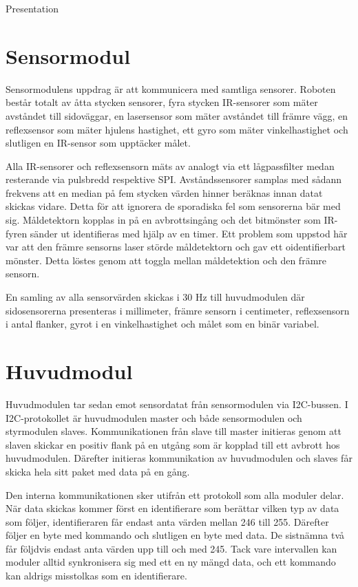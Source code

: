 \documentclass[10pt]{article}
\begin{document}
\begin{center}
\Huge Presentation
\end{center}

\section{Sensormodul}
Sensormodulens uppdrag är att kommunicera med samtliga sensorer. Roboten består totalt av åtta stycken sensorer, fyra stycken IR-sensorer som mäter avståndet till sidoväggar, en lasersensor som mäter avståndet till främre vägg, en reflexsensor som mäter hjulens hastighet, ett gyro som mäter vinkelhastighet och slutligen en IR-sensor som upptäcker målet. 

Alla IR-sensorer och reflexsensorn mäts av analogt via ett lågpassfilter medan resterande via pulsbredd respektive SPI. Avståndssensorer samplas med sådann frekvens att en median på fem stycken värden hinner beräknas innan datat skickas vidare. Detta för att ignorera de sporadiska fel som sensorerna bär med sig. Måldetektorn kopplas in på en avbrottsingång och det bitmönster som IR-fyren sänder ut identifieras med hjälp av en timer. Ett problem som uppstod här var att den främre sensorns laser störde måldetektorn och gav ett oidentifierbart mönster. Detta löstes genom att toggla mellan måldetektion och den främre sensorn. 

En samling av alla sensorvärden skickas i 30 Hz till huvudmodulen där sidosensorerna presenteras i millimeter, främre sensorn i centimeter, reflexsensorn i antal flanker, gyrot i en vinkelhastighet och målet som en binär variabel. 

\section{Huvudmodul}
Huvudmodulen tar sedan emot sensordatat från sensormodulen via I2C-bussen. I I2C-protokollet är huvudmodulen master och både sensormodulen och styrmodulen slaves. Kommunikationen från slave till master initieras genom att slaven skickar en positiv flank på en utgång som är kopplad till ett avbrott hos huvudmodulen. Därefter initieras kommunikation av huvudmodulen och slaves får skicka hela sitt paket med data på en gång. 

Den interna kommunikationen sker utifrån ett protokoll som alla moduler delar. När data skickas kommer först en identifierare som berättar vilken typ av data som följer, identifieraren får endast anta värden mellan 246 till 255. Därefter följer en byte med kommando och slutligen en byte med data. De sistnämna två får följdvis endast anta värden upp till och med 245. Tack vare intervallen kan moduler alltid synkronisera sig med ett en ny mängd data, och ett kommando kan aldrigs misstolkas som en identifierare. 
\end{document}

